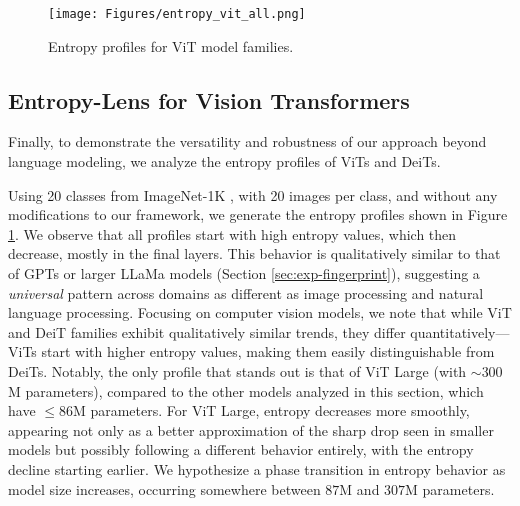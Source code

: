 
\begin{figure}[h]
    \centering
    \texttt{[image: Figures/entropy\_vit\_all.png]}
    \caption{Entropy profiles for ViT model families.}
    \label{fig:entropy-vit}
\end{figure}

\subsection{Entropy-Lens for Vision Transformers}\label{sec:exp-vit}
Finally, to demonstrate the versatility and robustness of our approach beyond language modeling, we analyze the entropy profiles of ViTs and DeiTs.

Using 20 classes from ImageNet-1K \citep{imagenet15russakovsky}, with 20 images per class, and without any modifications to our framework, we generate the entropy profiles shown in Figure \ref{fig:entropy-vit}. 
We observe that all profiles start with high entropy values, which then decrease, mostly in the final layers. This behavior is qualitatively similar to that of GPTs or larger LLaMa models (Section \ref{sec:exp-fingerprint}), suggesting a \textit{universal} pattern across domains as different as image processing and natural language processing.\newline
Focusing on computer vision models, we note that while ViT and DeiT families exhibit qualitatively similar trends, they differ quantitatively—ViTs start with higher entropy values, making them easily distinguishable from DeiTs.\newline
Notably, the only profile that stands out is that of ViT Large (with $\sim 300$M parameters), compared to the other models analyzed in this section, which have $\leq 86$M parameters.\newline
For ViT Large, entropy decreases more smoothly, appearing not only as a better approximation of the sharp drop seen in smaller models but possibly following a different behavior entirely, with the entropy decline starting earlier.\newline
We hypothesize a phase transition in entropy behavior as model size increases, occurring somewhere between $87$M and $307$M parameters.

